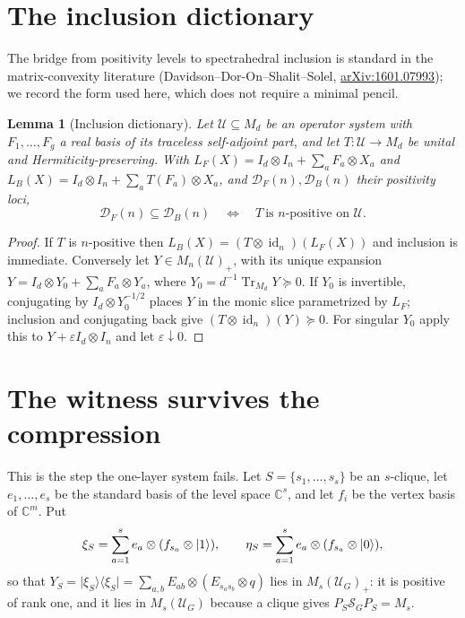 \documentclass[11pt,reqno]{amsart}
\theoremstyle{plain}
\newtheorem{lemma}[theorem]{Lemma}
\theoremstyle{remark}
\DeclareMathOperator{\Tr}{Tr}
\DeclareMathOperator{\id}{id}
\newcommand{\cS}{\mathcal S}
\newcommand{\cU}{\mathcal U}
\newcommand{\cD}{\mathcal D}
\newcommand{\ketbra}[2]{\lvert #1\rangle\!\langle #2\rvert}
\newcommand{\C}{\mathbb C}
\begin{document}
\section{The inclusion dictionary}

The bridge from positivity levels to spectrahedral inclusion is standard in the
matrix-convexity literature (Davidson--Dor-On--Shalit--Solel,
\href{https://arxiv.org/abs/1601.07993}{arXiv:1601.07993}); we record the form
used here, which does not require a minimal pencil.

\begin{lemma}[Inclusion dictionary]
\label{lem:dict}
Let $\cU\subseteq M_d$ be an operator system with $F_1,\dots,F_g$ a real basis
of its traceless self-adjoint part, and let $T:\cU\to M_d$ be unital and
Hermiticity-preserving.  With
$L_F(X)=I_d\otimes I_n+\sum_aF_a\otimes X_a$ and
$L_B(X)=I_d\otimes I_n+\sum_aT(F_a)\otimes X_a$, and $\cD_F(n),\cD_B(n)$ their
positivity loci,
\[
    \cD_F(n)\subseteq\cD_B(n)
    \quad\Longleftrightarrow\quad
    T\ \text{is $n$-positive on }\cU .
\]
\end{lemma}

\begin{proof}
If $T$ is $n$-positive then $L_B(X)=(T\otimes\id_n)(L_F(X))$ and inclusion is
immediate.  Conversely let $Y\in M_n(\cU)_+$, with its unique expansion
$Y=I_d\otimes Y_0+\sum_aF_a\otimes Y_a$, where $Y_0=d^{-1}\Tr_{M_d}Y\succeq0$.
If $Y_0$ is invertible, conjugating by $I_d\otimes Y_0^{-1/2}$ places $Y$ in
the monic slice parametrized by $L_F$; inclusion and conjugating back give
$(T\otimes\id_n)(Y)\succeq0$.  For singular $Y_0$ apply this to
$Y+\varepsilon I_d\otimes I_n$ and let $\varepsilon\downarrow0$.
\end{proof}

\section{The witness survives the compression}

This is the step the one-layer system fails.  Let $S=\{s_1,\dots,s_s\}$ be an
$s$-clique, let $e_1,\dots,e_s$ be the standard basis of the level space
$\C^s$, and let $f_i$ be the vertex basis of $\C^m$.  Put
\begin{equation}
\label{eq:witness}
    \xi_S=\sum_{a=1}^se_a\otimes(f_{s_a}\otimes\ket1),
    \qquad
    \eta_S=\sum_{a=1}^se_a\otimes(f_{s_a}\otimes\ket0),
\end{equation}
so that
$Y_S=\ketbra{\xi_S}{\xi_S}=\sum_{a,b}E_{ab}\otimes(E_{s_as_b}\otimes q)$
lies in $M_s(\cU_G)_+$: it is positive of rank one, and it lies in
$M_s(\cU_G)$ because a clique gives $P_S\cS_GP_S=M_s$.
\end{document}
